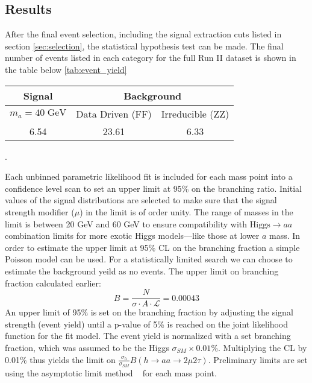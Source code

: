 
\subsection{Results}
\label{sec:res}
After the final event selection, including the signal extraction cuts listed in section \ref{sec:selection}, the statistical hypothesis test can be made. 
The final number of events listed in each category for the full Run II dataset is shown in the table below \ref{tab:event_yield}


\begin{table}[h!tbp]
\centering
{}
\begin{tabular*}{0.6\textwidth}{c|c|c}
\hline
Signal & \multicolumn{2}{c}{Background} \\
\hline $m_a=40\;\text{GeV}$ & Data Driven (FF) & Irreducible (ZZ)\\\hline
6.54   & 23.61 & 6.33 \\\hline
\end{tabular*}
\end{table}.
 



Each unbinned parametric likelihood fit is included for each mass point into a confidence level scan to set an upper limit at 95\% on the branching ratio. 
Initial values of the signal distributions are selected to make sure that the signal strength modifier ($\mu$) in the limit is of order unity. 
The range of masses in the limit is between 20 GeV and 60 GeV to ensure compatibility with $\text{Higgs} \rightarrow a a $ combination limits for more exotic Higgs models---like those at lower $a$ mass. 
In order to estimate the upper limit at 95\% CL on the branching fraction a simple Poisson model can be used. For a statistically limited search we can choose to estimate the background yeild as no events. The upper limit on branching fraction calculated earlier: 
\begin{equation}B =  \frac{N}{\sigma \cdot A\cdot \mathcal{L}} = 0.00043\end{equation} 
An upper limit of 95\% is set on the branching fraction by adjusting the signal strength (event yield) until a p-value of 5\% is reached on the joint likelihood function for the fit model. 
The event yield is normalized with a set branching fraction, which was assumed to be the Higgs $\sigma_{SM} \times 0.01\%$.
Multiplying the CL by 0.01\% thus yields the limit on $\frac{\sigma_h}{\sigma_{SM}} B(h\rightarrow aa\rightarrow2\mu2\tau)$.
Preliminary limits are set using the asymptotic limit method ~\cite{Cowan_2011} for each mass point.


